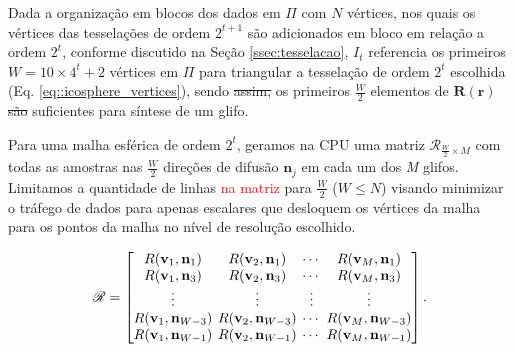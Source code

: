 Dada a organização em blocos dos dados em $\Pi$ com $N$ vértices, nos quais os vértices das tesselações de ordem $2^{t+1}$ são adicionados em bloco em relação a ordem $2^t$, conforme discutido na Seção \ref{ssec:tesselacao}, $I_t$ referencia os primeiros $W = 10 \times 4^t + 2$ vértices em $\Pi$ para triangular a tesselação de ordem $2^t$ escolhida (Eq. \ref{eq::icosphere_vertices}), sendo \sout{assim,} os primeiros $\frac{W}{2}$ elementos de $\boldsymbol{R}(\mathbf{r})$ \sout{são} suficientes para síntese de um glifo.

Para uma malha esférica de ordem $2^t$, geramos na CPU uma matriz $\boldsymbol{\mathscr{R}}_{\frac{W}{2} \times M}$ com todas as amostras nas $\frac{W}{2}$ direções de difusão $\mathbf{n}_j$ em cada um dos \textit{M} glifos. Limitamos a quantidade de linhas \textcolor{red}{na matriz} para $\frac{W}{2}$ ($W \leq N$) visando minimizar o tráfego de dados para apenas escalares que desloquem os vértices da malha para os pontos da malha no nível de resolução escolhido.


\begin{equation}
\label{eq::R}
\boldsymbol{\mathscr{R}} = 
\begingroup %
\setlength\arraycolsep{2pt}
\begin{bmatrix} 
    R(\mathbf{v}_{1}, \mathbf{n}_1) &
    R(\mathbf{v}_{2}, \mathbf{n}_1) & \cdots & 
    R(\mathbf{v}_{M}, \mathbf{n}_1)  \\
    
    R(\mathbf{v}_{1}, \mathbf{n}_3) &
    R(\mathbf{v}_{2}, \mathbf{n}_3) & \cdots & 
    R(\mathbf{v}_{M}, \mathbf{n}_{3}) \\ \vdots & \vdots & \vdots & \vdots  \\
    
    R(\mathbf{v}_{1}, \mathbf{n}_{W-3}) &
    R(\mathbf{v}_{2}, \mathbf{n}_{W-3}) & \cdots & 
    R(\mathbf{v}_{M}, \mathbf{n}_{W-3})  \\
    
    R(\mathbf{v}_{1}, \mathbf{n}_{W-1}) & 
    R(\mathbf{v}_{2}, \mathbf{n}_{W-1}) & \cdots & 
    R(\mathbf{v}_{M}, \mathbf{n}_{W-1})
\end{bmatrix}.
\endgroup
\end{equation}

